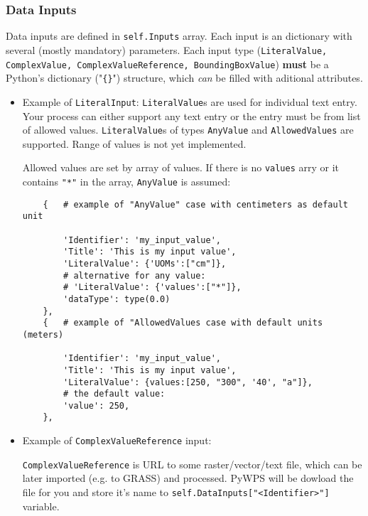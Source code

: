 \documentclass[a4paper,11pt]{article}
\begin{document}
    \subsubsection{Data Inputs}
     
    Data inputs are defined in \texttt{self.Inputs} array. Each input is an dictionary with
    several (mostly mandatory) parameters. Each input type
    (\texttt{LiteralValue, ComplexValue, ComplexValueReference,
    BoundingBoxValue}) \textbf{must} be a Python's dictionary
    ("\texttt{\{\}}") structure, which \emph{can} be filled with aditional
    attributes.


    \begin{itemize}
        \item Example of \texttt{LiteralInput}:
        \texttt{LiteralValue}s are used for individual text entry. Your
        process can either support any text entry or the entry must be from
        list of allowed values. \texttt{LiteralValue}s of types \texttt{AnyValue} and
        \texttt{AllowedValues} are supported. Range of values is not yet
        implemented. 

        Allowed values are set by array of values. If there is no
        \texttt{values} arry or it contains \texttt{"*"}
        in the array, \texttt{AnyValue} is assumed:

    \begin{verbatim}
    {   # example of "AnyValue" case with centimeters as default unit

        'Identifier': 'my_input_value',
        'Title': 'This is my input value',
        'LiteralValue': {'UOMs':["cm"]},
        # alternative for any value:
        # 'LiteralValue': {'values':["*"]},
        'dataType': type(0.0)
    },
    {   # example of "AllowedValues case with default units (meters)

        'Identifier': 'my_input_value',
        'Title': 'This is my input value',
        'LiteralValue': {values:[250, "300", '40', "a"]},
        # the default value:
        'value': 250,
    },

    \end{verbatim}
         

        \item Example of \texttt{ComplexValueReference} input:

        \texttt{ComplexValueReference} is URL to some raster/vector/text
        file, which can be later imported (e.g. to GRASS) and processed.
        PyWPS will be dowload the file for you and store it's name to
        \texttt{self.DataInputs["<Identifier>"]} variable.


\end{itemize}
\end{document}
